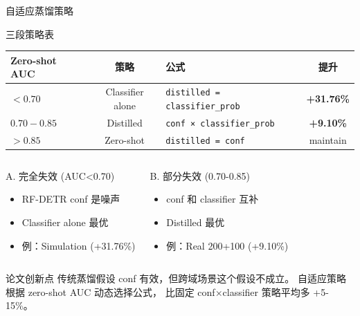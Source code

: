 \documentclass[aspectratio=169, 10pt]{beamer}
\begin{document}
\begin{frame}{自适应蒸馏策略}
  \begin{block}{三段策略表}
    \centering
    \begin{tabular}{lclc}
      \toprule
      \textbf{Zero-shot AUC} & \textbf{策略} & \textbf{公式} & \textbf{提升} \\
      \midrule
      $< 0.70$ & Classifier alone & \texttt{distilled = classifier\_prob} & \textcolor{mygreen}{\textbf{+31.76\%}} \\
      $0.70 - 0.85$ & Distilled & \texttt{conf × classifier\_prob} & \textcolor{mygreen}{\textbf{+9.10\%}} \\
      $> 0.85$ & Zero-shot & \texttt{distilled = conf} & maintain \\
      \bottomrule
    \end{tabular}
  \end{block}
  \vspace{-0.3em}
  \begin{columns}[T]
    \begin{block}{A. 完全失效 (AUC<0.70)}
      \begin{itemize}
        \item RF-DETR conf 是噪声
        \item Classifier alone 最优
        \item 例：Simulation (+31.76\%)
      \end{itemize}
    \end{block}
    \begin{block}{B. 部分失效 (0.70-0.85)}
      \begin{itemize}
        \item conf 和 classifier 互补
        \item Distilled 最优
        \item 例：Real 200+100 (+9.10\%)
      \end{itemize}
    \end{block}
  \end{columns}
  \vspace{-0.3em}
  \begin{alertblock}{论文创新点}
    传统蒸馏假设 conf 有效，但跨域场景这个假设不成立。
    自适应策略根据 zero-shot AUC 动态选择公式，
    比固定 conf×classifier 策略平均多 +5-15\%。
  \end{alertblock}
\end{frame}
\end{document}
